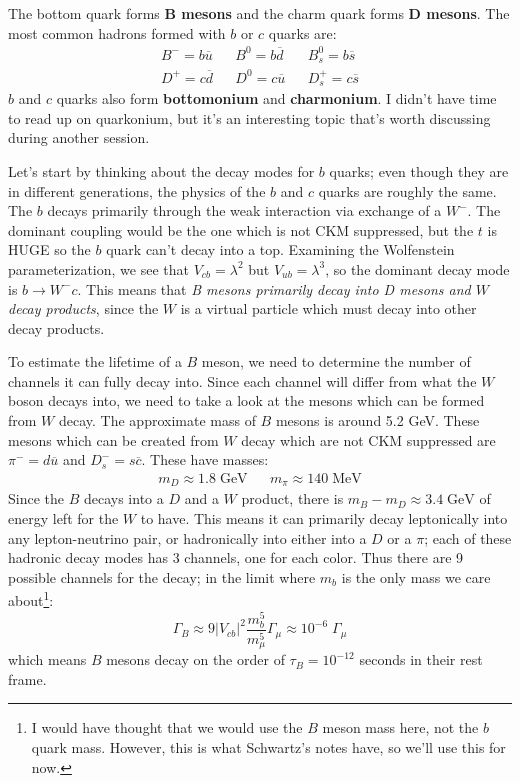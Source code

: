 \documentclass[11pt, oneside]{article}   	%
\theoremstyle{definition}
\numberwithin{equation}{subsection}		%
\begin{document}
The bottom quark forms \textbf{B mesons} and the charm quark forms \textbf{D mesons}. The most common hadrons formed with $b$ 
or $c$ quarks are:
\begin{align}
	B^- = b\overline u && B^0 = b\overline d && B_s^0 = b\overline s \\
	D^+ = c\overline d && D^0 = c\overline u && D_s^+ = c\overline s
\end{align}
$b$ and $c$ quarks also form \textbf{bottomonium} and \textbf{charmonium}. I didn't have time to read up on quarkonium, but it's an 
interesting topic that's worth discussing during another session.

Let's start by thinking about the decay modes for $b$ quarks; even though they are in different generations, the physics of the $b$ and $c$ 
quarks are roughly the same. The $b$ decays primarily through the weak interaction via exchange of a $W^-$. The dominant coupling would 
be the one which is not CKM suppressed, but the $t$ is HUGE so the $b$ quark can't decay into a top. Examining the Wolfenstein 
parameterization, we see that $V_{cb} = \lambda^2$ but $V_{ub} = \lambda^3$, so the dominant decay mode is $b\rightarrow W^- c$. 
This means that \textit{B mesons primarily decay into D mesons and $W$ decay products}, since the $W$ is a virtual particle which 
must decay into other decay products.

To estimate the lifetime of a $B$ meson, we need to determine the number of channels it can fully decay into. Since each channel will 
differ from what the $W$ boson decays into, we need to take a look at the mesons which can be formed from $W$ decay. The approximate 
mass of $B$ mesons is around 5.2 GeV. These mesons which can be created from $W$ decay which are not CKM suppressed are 
$\pi^- = d\overline u$ and $D_s^- = s\overline c$. These have masses:
\begin{align}
	m_{D}\approx 1.8\;\mathrm{GeV} && m_\pi\approx 140\;\mathrm{MeV}
\end{align}
Since the $B$ decays into a $D$ and a $W$ product, there is $m_B - m_D\approx 3.4\;\mathrm{GeV}$ of energy left for the $W$ to have. 
This means it can primarily decay leptonically into any lepton-neutrino pair, or hadronically into either into a $D$ or a $\pi$; each of these 
hadronic decay modes has 3 channels, one for each color. Thus there are 9 possible channels for the decay; in the limit where $m_b$ is 
the only mass we care about\footnote{I would have thought that we would use the $B$ meson mass here, not the $b$ quark mass. However, this is what Schwartz's notes have, so we'll use this for now.}:
\begin{equation}
	\Gamma_B\approx 9 |V_{cb}|^2\frac{m_b^5}{m_\mu^5} \Gamma_\mu\approx 10^{-6} \;\Gamma_\mu
\end{equation}
which means $B$ mesons decay on the order of $\tau_B = 10^{-12}$ seconds in their rest frame. 
\end{document}
